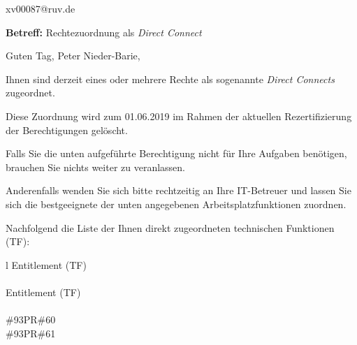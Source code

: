 \documentclass[a4paper,landscape,12pt]{letter}
\begin{document}
\begin{letter}{xv00087@ruv.de\hfill \break}
\begin{normalsize}
	\opening{\textbf{Betreff:} Rechtezuordnung als \emph{Direct Connect}}
	\begin{normalsize} \hfill
	\end{normalsize}

	\begin{normalsize}
		Guten Tag, 
	Peter Nieder-Barie, \hfill \break
	\end{normalsize}
	\end{normalsize}
	
\begin{normalsize}
	Ihnen sind derzeit eines oder mehrere Rechte als sogenannte \emph{Direct Connects} zugeordnet.
	
	Diese Zuordnung wird zum 01.06.2019 im Rahmen der aktuellen Rezertifizierung der Berechtigungen gelöscht.
	
	Falls Sie die unten aufgeführte Berechtigung nicht für Ihre Aufgaben benötigen, 
	brauchen Sie nichts weiter zu veranlassen.
	
	Anderenfalls wenden Sie sich bitte rechtzeitig an Ihre IT-Betreuer 
	und lassen Sie sich die bestgeeignete der unten angegebenen Arbeitsplatzfunktionen zuordnen.
	\end{normalsize}
	
\begin{normalsize}
	Nachfolgend die Liste der Ihnen direkt zugeordneten technischen Funktionen (TF):

	\begin{longtable}{l}
		Entitlement (TF) \\ \hline
		\endfirsthead
		\\\hline
		Entitlement (TF) \\ \hline
		\endhead %
		\multicolumn{1}{r@{}}{Fortsetzung \ldots}\\
		\endfoot
		\hline
		\endlastfoot
	\#93PR\#60\\\#93PR\#61\\
	\end{longtable}
	\end{normalsize}
	

\end{letter}
\end{document}
